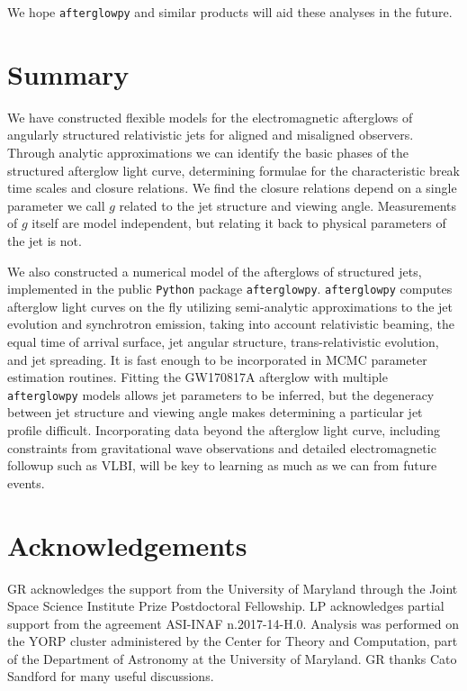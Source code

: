 \documentclass[twocolumn]{aastex62}
\newcommand{\gwbns}{GW170817A}
\newcommand{\afterglowpy}{{\tt afterglowpy}}
\newcommand{\python}{{\tt Python}}
\begin{document}
We hope \afterglowpy{} and similar products will aid these analyses in the future.  

\section{Summary}\label{sec:summary}

We have constructed flexible models for the electromagnetic afterglows of angularly structured relativistic jets for aligned and misaligned observers.  Through analytic approximations we can identify the basic phases of the structured afterglow light curve, determining formulae for the characteristic break time scales and closure relations.  We find the closure relations depend on a single parameter we call $g$ related to the jet structure and viewing angle.  Measurements of $g$ itself are model independent, but relating it back to physical parameters of the jet is not.

We also constructed a numerical model of the afterglows of structured jets, implemented in the public \python{} package \afterglowpy{}. \afterglowpy{} computes afterglow light curves on the fly utilizing semi-analytic approximations to the jet evolution and synchrotron emission, taking into account relativistic beaming, the equal time of arrival surface, jet angular structure, trans-relativistic evolution, and jet spreading.  It is fast enough to be incorporated in MCMC parameter estimation routines.  Fitting the \gwbns{} afterglow with multiple \afterglowpy{} models allows jet parameters to be inferred, but the degeneracy between jet structure and viewing angle makes determining a particular jet profile difficult.  Incorporating data beyond the afterglow light curve, including constraints from gravitational wave observations and detailed electromagnetic followup such as VLBI, will be key to learning as much as we can from future events.

\section{Acknowledgements} \label{sec:acknowledgements}

GR acknowledges the support from the University of Maryland through the Joint Space Science Institute Prize Postdoctoral Fellowship. LP acknowledges partial support from the agreement ASI-INAF n.2017-14-H.0. Analysis was performed on the YORP cluster administered by the Center for Theory and Computation, part of the Department of Astronomy at the University of Maryland.  GR thanks Cato Sandford for many useful discussions.
\end{document}
